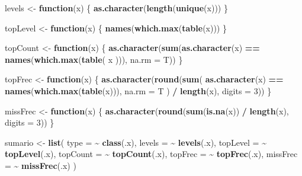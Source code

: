 \documentclass[notspecified,article,submit,moreauthors,pdftex]{Definitions/mdpi}
\newenvironment{Shaded}{\begin{snugshade}}{\end{snugshade}}
\newcommand{\AttributeTok}[1]{\textcolor[rgb]{0.13,0.29,0.53}{#1}}
\newcommand{\ControlFlowTok}[1]{\textcolor[rgb]{0.13,0.29,0.53}{\textbf{#1}}}
\newcommand{\DecValTok}[1]{\textcolor[rgb]{0.00,0.00,0.81}{#1}}
\newcommand{\FunctionTok}[1]{\textcolor[rgb]{0.13,0.29,0.53}{\textbf{#1}}}
\newcommand{\NormalTok}[1]{#1}
\newcommand{\OtherTok}[1]{\textcolor[rgb]{0.56,0.35,0.01}{#1}}
\newcommand{\SpecialCharTok}[1]{\textcolor[rgb]{0.81,0.36,0.00}{\textbf{#1}}}
\begin{document}
\begin{Shaded}
\begin{Highlighting}[]
\NormalTok{levels }\OtherTok{\textless{}{-}} \ControlFlowTok{function}\NormalTok{(x) \{}
  \FunctionTok{as.character}\NormalTok{(}\FunctionTok{length}\NormalTok{(}\FunctionTok{unique}\NormalTok{(x)))}
\NormalTok{\}}

\NormalTok{topLevel }\OtherTok{\textless{}{-}} \ControlFlowTok{function}\NormalTok{(x) \{}
  \FunctionTok{names}\NormalTok{(}\FunctionTok{which.max}\NormalTok{(}\FunctionTok{table}\NormalTok{(x)))}
\NormalTok{\}}

\NormalTok{topCount }\OtherTok{\textless{}{-}} \ControlFlowTok{function}\NormalTok{(x) \{}
  \FunctionTok{as.character}\NormalTok{(}\FunctionTok{sum}\NormalTok{(}\FunctionTok{as.character}\NormalTok{(x) }\SpecialCharTok{==} \FunctionTok{names}\NormalTok{(}\FunctionTok{which.max}\NormalTok{(}\FunctionTok{table}\NormalTok{(}
\NormalTok{    x}
\NormalTok{  ))), }\AttributeTok{na.rm =}\NormalTok{ T))}
\NormalTok{\}}

\NormalTok{topFrec }\OtherTok{\textless{}{-}} \ControlFlowTok{function}\NormalTok{(x) \{}
  \FunctionTok{as.character}\NormalTok{(}\FunctionTok{round}\NormalTok{(}\FunctionTok{sum}\NormalTok{(}
    \FunctionTok{as.character}\NormalTok{(x) }\SpecialCharTok{==} \FunctionTok{names}\NormalTok{(}\FunctionTok{which.max}\NormalTok{(}\FunctionTok{table}\NormalTok{(x))), }\AttributeTok{na.rm =}\NormalTok{ T}
\NormalTok{  ) }\SpecialCharTok{/} \FunctionTok{length}\NormalTok{(x), }\AttributeTok{digits =} \DecValTok{3}\NormalTok{))}
\NormalTok{\}}

\NormalTok{missFrec }\OtherTok{\textless{}{-}} \ControlFlowTok{function}\NormalTok{(x) \{}
  \FunctionTok{as.character}\NormalTok{(}\FunctionTok{round}\NormalTok{(}\FunctionTok{sum}\NormalTok{(}\FunctionTok{is.na}\NormalTok{(x)) }\SpecialCharTok{/} \FunctionTok{length}\NormalTok{(x), }\AttributeTok{digits =} \DecValTok{3}\NormalTok{))}
\NormalTok{\}}

\NormalTok{sumario }\OtherTok{\textless{}{-}}
  \FunctionTok{list}\NormalTok{(}
    \AttributeTok{type =} \SpecialCharTok{\textasciitilde{}} \FunctionTok{class}\NormalTok{(.x),}
    \AttributeTok{levels =} \SpecialCharTok{\textasciitilde{}} \FunctionTok{levels}\NormalTok{(.x),}
    \AttributeTok{topLevel =} \SpecialCharTok{\textasciitilde{}} \FunctionTok{topLevel}\NormalTok{(.x),}
    \AttributeTok{topCount =} \SpecialCharTok{\textasciitilde{}} \FunctionTok{topCount}\NormalTok{(.x),}
    \AttributeTok{topFrec =} \SpecialCharTok{\textasciitilde{}} \FunctionTok{topFrec}\NormalTok{(.x),}
    \AttributeTok{missFrec =} \SpecialCharTok{\textasciitilde{}} \FunctionTok{missFrec}\NormalTok{(.x)}
\NormalTok{  )}


\end{Highlighting}
\end{Shaded}
\end{document}
